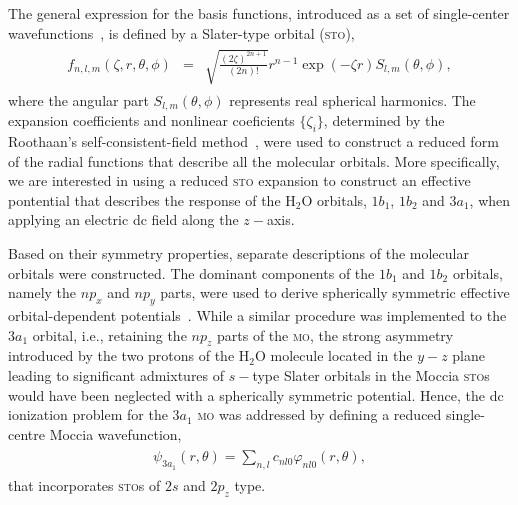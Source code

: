 The general expression for the basis functions, introduced as a set of
single-center
wavefunctions~\cite{Moccia_1964,Moccia_JCP_2164,Moccia_JCP_2176}, is
defined by a Slater-type orbital (\textsc{sto}),
%
\begin{eqnarray}
  \begin{split}
 f_{n, l, m}(\zeta,r,\theta,\phi) & = & \sqrt{\frac{(2\zeta)^{2n+1}}{(2n)!}}
 r^{n-1} \exp(-\zeta r) S_{l, m}(\theta,\phi),
 \end{split}
\label{eq:sto}
\end{eqnarray}
%
where the angular part $S_{l,m}(\theta,\phi)$ represents real
spherical harmonics. The expansion coefficients and nonlinear
coeficients $\{\zeta_{i}\}$, determined by the Roothaan's
self-consistent-field method~\cite{Moccia_1964,Roothaan_1951}, were
used to construct a reduced form of the radial functions that describe
all the molecular orbitals. More specifically, we are interested in
using a reduced \textsc{sto} expansion to construct an effective
pontential that describes the response of the H$_{2}$O orbitals,
$1b_{1}$, $1b_{2}$ and $3a_{1}$, when applying an electric dc field
along the $z-$axis.

Based on their symmetry properties, separate descriptions of the
molecular orbitals were constructed. The dominant components of the
$1b_{1}$ and $1b_{2}$ orbitals, namely the $np_{x}$ and $np_{y}$
parts, were used to derive spherically symmetric effective
orbital-dependent potentials~\cite{sarias_2016}. While a similar
procedure was implemented to the $3a_{1}$ orbital, i.e., retaining the
$np_{z}$ parts of the \textsc{mo}, the strong asymmetry introduced by
the two protons of the H$_{2}$O molecule located in the $y-z$ plane
leading to significant admixtures of $s-$type Slater orbitals in the
Moccia \textsc{sto}s~\cite{Moccia_1964} would have been neglected with
a spherically symmetric potential. Hence, the dc ionization problem
for the $3a_{1}$ \textsc{mo} was addressed by defining a reduced
single-centre Moccia wavefunction,
%
\begin{eqnarray}
  \begin{split}
    \psi_{3a_{1}}(r,\theta) = \sum_{n,l} c_{nl0} \varphi_{nl0}(r,\theta),
  \end{split}
  \label{eq:psi_3a1}
\end{eqnarray}
%
that incorporates \textsc{sto}s of $2s$ and $2p_{z}$ type.














